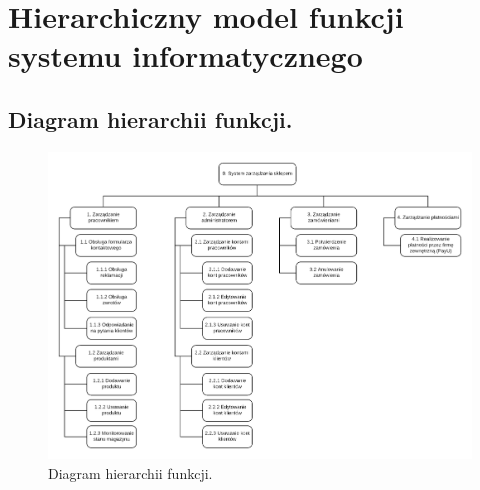 \documentclass[a4paper,11pt]{article}
\begin{document}
\section {Hierarchiczny model funkcji systemu informatycznego}
\subsection {Diagram hierarchii funkcji.}

\begin{figure}[h]
\includegraphics[width=16cm]{Diagramy/HierarchiiFunkcji.png}
\caption{Diagram hierarchii funkcji.}
\centering
\end{figure}
\end{document}
